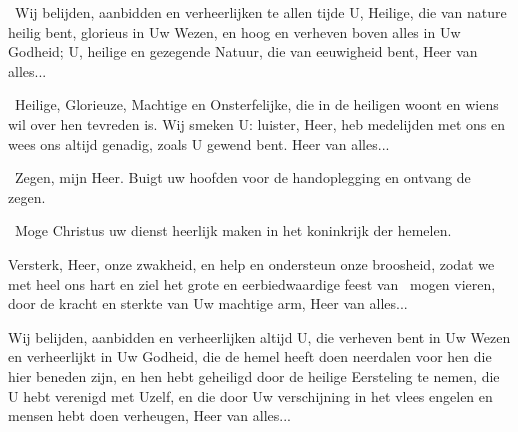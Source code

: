 \documentclass[12pt,twoside,a5paper]{article}
\begin{document}
\begin{halfparskip}
   \cc~Wij belijden, aanbidden en verheerlijken te allen tijde U, Heilige, die van nature heilig bent, glorieus in Uw Wezen, en hoog en verheven boven alles in Uw Godheid; U, heilige en gezegende Natuur, die van eeuwigheid bent, Heer van alles...
\end{halfparskip}

\begin{halfparskip}
   \cc~Heilige, Glorieuze, Machtige en Onsterfelijke, die in de heiligen woont en wiens wil over hen tevreden is. Wij smeken U: luister, Heer, heb medelijden met ons en wees ons altijd genadig, zoals U gewend bent. Heer van alles...
\end{halfparskip}

\begin{halfparskip}
   \dd~Zegen, mijn Heer. Buigt uw hoofden voor de handoplegging en ontvang de zegen.

  \cc~Moge Christus uw dienst heerlijk maken in het koninkrijk der hemelen.

\end{halfparskip}

\begin{halfparskip}\begin{sfpar}


   Versterk, Heer, onze zwakheid, en help en ondersteun onze broosheid, zodat we met heel ons hart en ziel het grote en eerbiedwaardige feest van \NN~mogen vieren, door de kracht en sterkte van Uw machtige arm, Heer van alles...

   Wij belijden, aanbidden en verheerlijken altijd U, die verheven bent in Uw Wezen en verheerlijkt in Uw Godheid, die de hemel heeft doen neerdalen voor hen die hier beneden zijn, en hen hebt geheiligd door de heilige Eersteling te nemen, die U hebt verenigd met Uzelf, en die door Uw verschijning in het vlees engelen en mensen hebt doen verheugen, Heer van alles...

\end{sfpar}\end{halfparskip}
\end{document}
